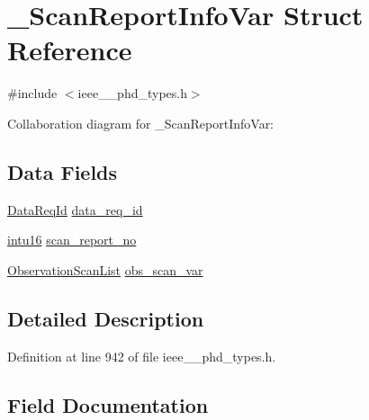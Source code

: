 \hypertarget{struct___scan_report_info_var}{}\section{\+\_\+\+Scan\+Report\+Info\+Var Struct Reference}
\label{struct___scan_report_info_var}


{\ttfamily \#include $<$ieee\+\_\+\_\+phd\+\_\+types.\+h$>$}



Collaboration diagram for \+\_\+\+Scan\+Report\+Info\+Var\+:
\subsection*{Data Fields}
\begin{DoxyCompactItemize}
\item 
\hyperlink{ieee__11073__phd__types_8h_ab2d118926c6a08395e5d075382450ae0}{Data\+Req\+Id} \hyperlink{struct___scan_report_info_var_a1c786af4096ed61c5f6cfdf27f317b70}{data\+\_\+req\+\_\+id}
\item 
\hyperlink{ieee__11073__phd__types_8h_a3561595d2aa7416532e1c9910abd076d}{intu16} \hyperlink{struct___scan_report_info_var_a21f75132869d4d200ffe01d91b4736d8}{scan\+\_\+report\+\_\+no}
\item 
\hyperlink{ieee__11073__phd__types_8h_a2ef4f8e0afe1044aa0577cb42d57463c}{Observation\+Scan\+List} \hyperlink{struct___scan_report_info_var_a6d5c6c418b113f9a497af2f629f77440}{obs\+\_\+scan\+\_\+var}
\end{DoxyCompactItemize}


\subsection{Detailed Description}


Definition at line 942 of file ieee\+\_\+\_\+phd\+\_\+types.\+h.



\subsection{Field Documentation}
\hypertarget{struct___scan_report_info_var_a1c786af4096ed61c5f6cfdf27f317b70}{}
